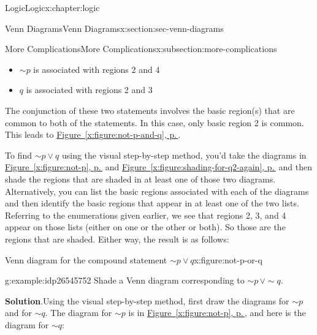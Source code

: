 \documentclass[twoside,10pt,]{book}
\newcommand{\blocktitlefont}{\relax}
\newcommand{\xreffont}{\relax}
\numberwithin{equation}{section}
\begin{document}
\begin{chapterptx}{Logic}{}{Logic}{}{}{x:chapter:logic}
\begin{sectionptx}{Venn Diagrams}{}{Venn Diagrams}{}{}{x:section:sec-venn-diagrams}
\begin{subsectionptx}{More Complications}{}{More Complications}{}{}{x:subsection:more-complications}
\begin{itemize}[label=\textbullet]
\item{}\(\sim\!{p}\) is associated with regions 2 and 4%
\item{}\(q\) is associated with regions 2 and 3%
\end{itemize}
The conjunction of these two statements involves the basic region(s) that are common to both of the statements.  In this case, only basic region 2 is common.  This leads to \hyperref[x:figure:not-p-and-q]{Figure~{\xreffont\ref{x:figure:not-p-and-q}}, p.\,\pageref{x:figure:not-p-and-q}}.%
\par
To find \(\sim\!{p}{\vee} q\) using the visual step-by-step method, you'd take the diagrams in \hyperref[x:figure:not-p]{Figure~{\xreffont\ref{x:figure:not-p}}, p.\,\pageref{x:figure:not-p}} and \hyperref[x:figure:shading-for-q2-again]{Figure~{\xreffont\ref{x:figure:shading-for-q2-again}}, p.\,\pageref{x:figure:shading-for-q2-again}} and then shade the regions that are shaded in at least one of those two diagrams.  Alternatively, you can list the basic regions associated with each of the diagrams and then identify the basic regions that appear in at least one of the two lists.  Referring to the enumerations given earlier, we see that regions 2, 3, and 4 appear on those lists (either on one or the other or both).  So those are the regions that are shaded.  Either way, the result is as follows:%
\par
\begin{figureptx}{Venn diagram for the compound statement \(\sim\!{p}{\vee} q\)}{x:figure:not-p-or-q}{}%
\begin{image}{0.3}{0.4}{0.3}%
\resizebox{\linewidth}{!}{%
\begin{venndiagram2sets}[labelA={$p$},labelB={$q$}]
  \fillNotA
  \fillB
\end{venndiagram2sets}
}%
\end{image}%
\tcblower
\end{figureptx}%
%
\begin{example}{}{g:example:idp26545752}%
Shade a Venn diagram corresponding to \(\sim\!{p}\,{\vee}\sim\!{q}\).\par\smallskip%
\noindent\textbf{\blocktitlefont Solution}.\label{g:solution:idp26547032}{}\hypertarget{g:solution:idp26547032}{}\quad{}Using the visual step-by-step method, first draw the diagrams for \(\sim\!{p}\) and for \(\sim\!{q}\).  The diagram for \(\sim\!{p}\) is in \hyperref[x:figure:not-p]{Figure~{\xreffont\ref{x:figure:not-p}}, p.\,\pageref{x:figure:not-p}}, and here is the diagram for \(\sim\!{q}\):%

\end{example}
\end{subsectionptx}
\end{sectionptx}
\end{chapterptx}
\end{document}
